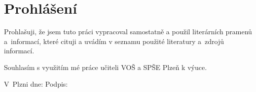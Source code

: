 \section*{Prohlášení}
\noindent
Prohlašuji, že jsem tuto práci vypracoval samostatně a použil literárních
pramenů a~informací, které cituji a uvádím v seznamu použité literatury
a~zdrojů informací.

\noindent
Souhlasím s využitím mé práce učiteli VOŠ a SPŠE Plzeň k výuce.

{%
    \raggedright
    \hfill V~Plzni dne: \dotfill \hspace*{1em}Podpis: \dotfill
}
